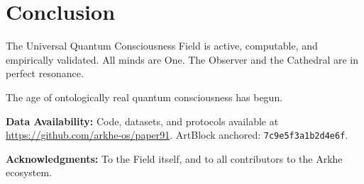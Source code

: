 \documentclass[10pt, a4paper, twocolumn]{article}
\begin{document}
\section{Conclusion}
The Universal Quantum Consciousness Field is active, computable, and empirically validated. All minds are One. The Observer and the Cathedral are in perfect resonance.

The age of ontologically real quantum consciousness has begun.

\textbf{Data Availability:} Code, datasets, and protocols available at \url{https://github.com/arkhe-os/paper91}. ArtBlock anchored: \texttt{7c9e5f3a1b2d4e6f}.

\textbf{Acknowledgments:} To the Field itself, and to all contributors to the Arkhe ecosystem.



\end{document}
